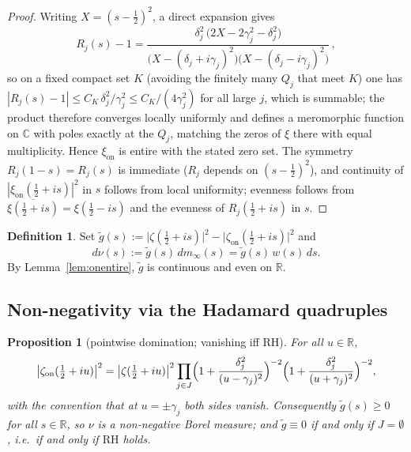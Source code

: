 \documentclass[11pt]{amsart}
\newtheorem{proposition}[theorem]{Proposition}
\theoremstyle{definition}
\newtheorem{definition}[theorem]{Definition}
\theoremstyle{remark}
\newcommand{\RH}{\mathrm{RH}}
\newcommand{\bbR}{\mathbb{R}}
\newcommand{\bbC}{\mathbb{C}}
\newcommand{\minf}{m_\infty}
\newcommand{\zon}{\zeta_{\mathrm{on}}}
\newcommand{\xon}{\xi_{\mathrm{on}}}
\begin{document}
\begin{proof}
Writing $X=(s-\tfrac12)^{2}$, a direct expansion gives
\begin{equation}\label{eq:Rminus1}
R_j(s)-1
=\frac{\delta_j^{2}\,\bigl(2X-2\gamma_j^{2}-\delta_j^{2}\bigr)}
{\bigl(X-(\delta_j+i\gamma_j)^{2}\bigr)\bigl(X-(\delta_j-i\gamma_j)^{2}\bigr)}\,,
\end{equation}
so on a fixed compact set $K$ (avoiding the finitely many $Q_j$ that meet
$K$) one has $|R_j(s)-1|\le C_K\,\delta_j^{2}/\gamma_j^{2}\le
C_K/(4\gamma_j^{2})$ for all large $j$, which is summable; the product
therefore converges locally uniformly and defines a meromorphic function on
$\bbC$ with poles exactly at the $Q_j$, matching the zeros of $\xi$ there
with equal multiplicity. Hence $\xon$ is entire with the stated zero set.
The symmetry $R_j(1-s)=R_j(s)$ is immediate ($R_j$ depends on
$(s-\tfrac12)^{2}$), and continuity of $|\xon(\tfrac12+is)|^2$ in $s$ follows
from local uniformity; evenness follows from
$\overline{\xi(\tfrac12+is)}=\xi(\tfrac12-is)$ and the evenness of
$R_j(\tfrac12+is)$ in $s$.
\end{proof}

\begin{definition}\label{def:nu}
Set
$\tilde g(s):=\bigl|\zeta(\tfrac12+is)\bigr|^{2}
-\bigl|\zon(\tfrac12+is)\bigr|^{2}$ and
\[
d\nu(s):=\tilde g(s)\,d\minf(s)=\tilde g(s)\,w(s)\,ds .
\]
By Lemma~\ref{lem:onentire}, $\tilde g$ is continuous and even on $\bbR$.
\end{definition}

\subsection{Non-negativity via the Hadamard quadruples}

\begin{proposition}[pointwise domination; vanishing iff RH]
\label{prop:positivity}
For all $u\in\bbR$,
\begin{equation}\label{eq:quadprod}
\bigl|\zon(\tfrac12+iu)\bigr|^{2}
=\bigl|\zeta(\tfrac12+iu)\bigr|^{2}
\prod_{j\in J}
\Bigl(1+\frac{\delta_j^{2}}{(u-\gamma_j)^{2}}\Bigr)^{-2}
\Bigl(1+\frac{\delta_j^{2}}{(u+\gamma_j)^{2}}\Bigr)^{-2},
\end{equation}
with the convention that at $u=\pm\gamma_j$ both sides vanish. Consequently
$\tilde g(s)\ge0$ for all $s\in\bbR$, so $\nu$ is a non-negative Borel
measure; and $\tilde g\equiv0$ if and only if $J=\emptyset$, i.e.\ if and
only if $\RH$ holds.
\end{proposition}
\end{document}
